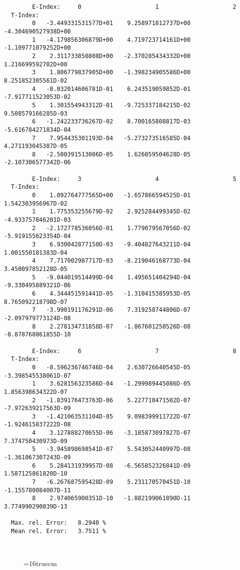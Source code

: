 \documentclass[12pt]{article}
\begin{document}
\begin{small}\begin{verbatim}
        E-Index:     0                     1                     2
  T-Index:
        0   -3.449331531577D+01    9.258971812737D+00   -4.304690527938D+00
        1   -4.179856306879D+00    4.719723714161D+00   -1.109771079252D+00
        2    2.311733850808D+00   -2.370285434332D+00    1.216699592702D+00
        3    1.806779837905D+00   -1.398234905586D+00    8.251852305561D-02
        4   -8.032014606781D-01    6.243519059852D-01   -7.917711523053D-02
        5    1.301554943312D-01   -9.725337184215D-02    9.508579166285D-03
        6   -1.242233736267D-02    8.700165808817D-03   -5.616784271834D-04
        7    7.954435301193D-04   -5.273273516585D-04    4.271193045387D-05
        8   -2.500391513086D-05    1.626059504628D-05   -2.107306577342D-06

        E-Index:     3                     4                     5
  T-Index:
        0    1.092764777565D+00   -1.657866594525D-01    1.542303956967D-02
        1    1.775353255679D-02    2.925284499345D-02   -4.933757846201D-03
        2   -2.172778536056D-01    1.779079567056D-02   -5.919155623354D-04
        3    6.930042877150D-03   -9.404827643211D-04    1.001550181383D-04
        4    7.717002987717D-03   -8.219046168773D-04    3.450097852128D-05
        5   -9.044019514499D-04    1.495651404294D-04   -9.330495889321D-06
        6    4.344451591441D-05   -1.310415385953D-05    8.765092218798D-07
        7   -3.990191176291D-06    7.319258744806D-07   -2.097979773124D-08
        8    2.278134731858D-07   -1.867601250526D-08   -8.878768861855D-10

        E-Index:     6                     7                     8
  T-Index:
        0   -8.596236746746D-04    2.630726640545D-05   -3.398545538061D-07
        1    3.628156323586D-04   -1.299989445086D-05    1.856398634322D-07
        2   -1.839176473763D-06    5.227710471502D-07   -7.972639217563D-09
        3   -1.421063531104D-05    9.098399911722D-07   -1.924615837222D-08
        4    3.127888270655D-06   -3.185873097827D-07    7.374750430973D-09
        5   -3.945898698541D-07    5.543052440997D-08   -1.361067307243D-09
        6    5.284131939957D-08   -6.565852326841D-09    1.587125861820D-10
        7   -6.267687595428D-09    5.231170570451D-10   -1.155780084007D-11
        8    2.974065900351D-10   -1.882199061890D-11    3.774990290039D-13

  Max. rel. Error:   8.2940 %
  Mean rel. Error:   3.7511 %



\end{verbatim}\end{small}
\begin{figure} \label{2.3.6rl}
\epsfxsize=16truecm
\end{figure}
\end{document}
